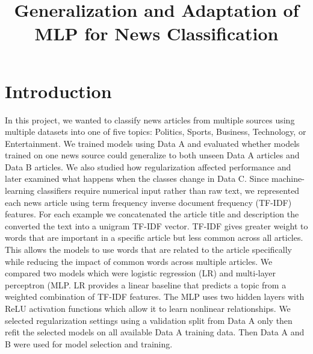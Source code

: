 \documentclass[letterpaper,conference,compsoc,onecolumn]{IEEEtran}
\begin{document}
\title{Generalization and Adaptation of MLP for News Classification}

\author{
  
}

\maketitle

\begingroup\renewcommand{}

\section{Introduction}

In this project, we wanted to classify news articles from multiple sources using multiple datasets into one of five topics: Politics, Sports, Business, Technology, or Entertainment. We trained models using Data A and evaluated whether models trained on one news source could generalize to both unseen Data A articles and Data B articles. We also studied how regularization affected performance and later examined what happens when the classes change in Data C. 
Since machine-learning classifiers require numerical input rather than raw text, we represented each news article using term frequency inverse document frequency (TF-IDF) features. For each example we concatenated the article title and description the converted the text into a unigram TF-IDF vector. TF-IDF gives greater weight to words that are important in a specific article but less common across all articles. This allows the models to use words that are related to the article specifically while reducing the impact of common words across multiple articles. 
We compared two models which were logistic regression (LR) and multi-layer perceptron (MLP. LR provides a linear baseline that predicts a topic from a weighted combination of TF-IDF features. The MLP uses two hidden layers with ReLU activation functions which allow it to learn nonlinear relationships. We selected regularization settings using a validation split from Data A only then refit the selected models on all available Data A training data. Then Data A and B were used for model selection and training.
\end{document}
